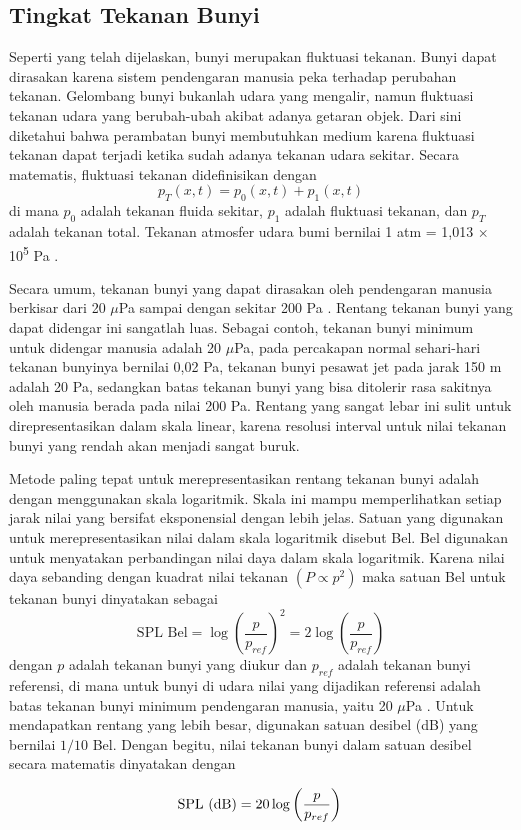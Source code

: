 \subsection{Tingkat Tekanan Bunyi}
Seperti yang telah dijelaskan, bunyi merupakan fluktuasi tekanan. Bunyi dapat dirasakan karena sistem pendengaran manusia peka terhadap perubahan tekanan. Gelombang bunyi bukanlah udara yang mengalir, namun fluktuasi tekanan udara yang berubah-ubah akibat adanya getaran objek. Dari sini diketahui bahwa perambatan bunyi membutuhkan medium karena fluktuasi tekanan dapat terjadi ketika sudah adanya tekanan udara sekitar. Secara matematis, fluktuasi tekanan didefinisikan dengan
\begin{equation}
    p_T(x,t)=p_0(x,t)+p_1(x,t)
\end{equation}
di mana $p_0$ adalah tekanan fluida sekitar, $p_1$ adalah fluktuasi tekanan, dan $p_T$ adalah tekanan total. Tekanan atmosfer udara bumi bernilai 1 atm = 1,013 $\times$ 10\textsuperscript{5} Pa \cite{handbookAcoustic}. \par 
Secara umum, tekanan bunyi yang dapat dirasakan oleh pendengaran manusia berkisar dari 20 $\mu$Pa sampai dengan sekitar 200 Pa \cite{handbookAcoustic}. Rentang tekanan bunyi yang dapat didengar ini sangatlah luas. Sebagai contoh, tekanan bunyi minimum untuk didengar manusia adalah 20 $\mu$Pa, pada percakapan normal sehari-hari tekanan bunyinya bernilai 0,02 Pa, tekanan bunyi pesawat jet pada jarak 150 m adalah 20 Pa, sedangkan batas tekanan bunyi yang bisa ditolerir rasa sakitnya oleh manusia berada pada nilai 200 Pa. Rentang yang sangat lebar ini sulit untuk direpresentasikan dalam skala linear, karena resolusi interval untuk nilai tekanan bunyi yang rendah akan menjadi sangat buruk. \par
Metode paling tepat untuk merepresentasikan rentang tekanan bunyi adalah dengan menggunakan skala logaritmik. Skala ini mampu memperlihatkan setiap jarak nilai yang bersifat eksponensial dengan lebih jelas. Satuan yang digunakan untuk merepresentasikan nilai dalam skala logaritmik disebut Bel. Bel digunakan untuk menyatakan perbandingan nilai daya dalam skala logaritmik. Karena nilai daya sebanding dengan kuadrat nilai tekanan $\left(P \varpropto p^2\right)$ \cite{handbookAcoustic} maka satuan Bel untuk tekanan bunyi dinyatakan sebagai
\begin{equation}
    \text{SPL Bel} = \log \left(\frac{p}{p_{ref}}\right)^2 = 2 \log \left(\frac{p}{p_{ref}}\right)
\end{equation}
dengan $p$ adalah tekanan bunyi yang diukur dan $p_{ref}$ adalah tekanan bunyi referensi, di mana untuk bunyi di udara nilai yang dijadikan referensi adalah batas tekanan bunyi minimum pendengaran manusia, yaitu 20 $\mu$Pa \cite{handbookAcoustic}. Untuk mendapatkan rentang yang lebih besar, digunakan satuan desibel (dB) yang bernilai $1/10$ Bel. Dengan begitu, nilai tekanan bunyi dalam satuan desibel secara matematis dinyatakan dengan \par 
\begin{equation}
    \text{SPL (dB)} = 20 \log \left(\frac{p}{p_{ref}}\right) \\
    \label{eq:spl-desibel}
\end{equation}

